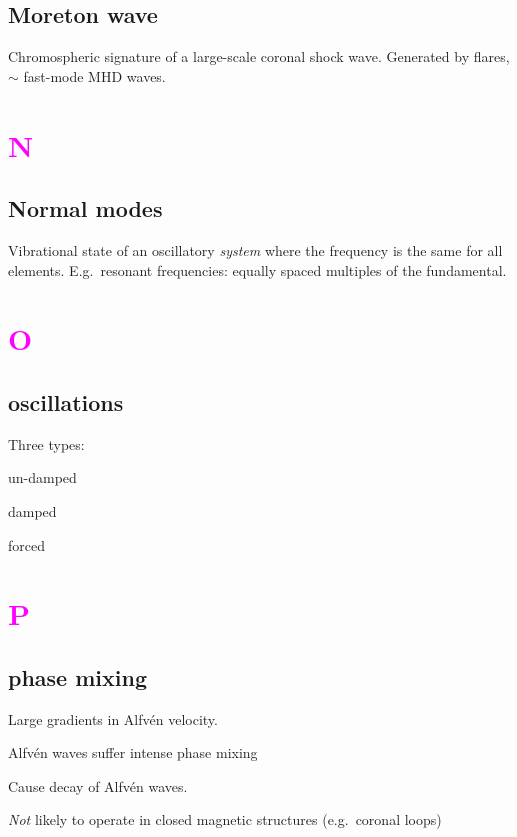 \documentclass[12pt]{article}
\begin{document}
\subsection*{Moreton wave}
Chromospheric signature of a large-scale coronal shock wave. Generated
by flares, $\sim$ fast-mode MHD waves.

\section*{\textcolor{magenta}{N}}
\subsection*{Normal modes}
Vibrational state of an oscillatory \emph{system} where the frequency
is the same for all elements. E.g.\ resonant frequencies: equally
spaced multiples of the fundamental.

\section*{\textcolor{magenta}{O}}
\subsection*{oscillations}
Three types:
\begin{enumerate*}
    \item un-damped
    \item damped
    \item forced
\end{enumerate*}

\section*{\textcolor{magenta}{P}}

\subsection*{phase mixing}
\begin{itemize*}
    \item Large gradients in Alfv\'en velocity.
    \item Alfv\'en waves suffer intense phase mixing
    \item Cause decay of Alfv\'en waves.
    \item \emph{Not} likely to operate in closed magnetic structures
        (e.g.\ coronal loops)
\end{itemize*}
\end{document}
